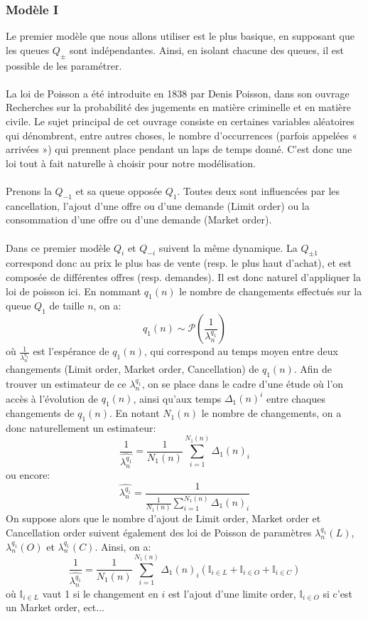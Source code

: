 \documentclass[12pt,a4paper]{article}
\theoremstyle{definition}
\theoremstyle{remark}
\begin{document}
    \subsubsection{Modèle I}

    Le premier modèle que nous allons utiliser est le plus basique, en supposant que les queues $Q_{\pm }$ sont indépendantes. Ainsi, en isolant chacune des queues, il est possible de les paramétrer.
    \\
    \\
    La loi de Poisson a été introduite en 1838 par Denis Poisson, dans son ouvrage Recherches sur la probabilité des jugements en matière criminelle et en matière civile. Le sujet principal de cet ouvrage consiste en certaines variables aléatoires qui dénombrent, entre autres choses, le nombre d'occurrences (parfois appelées « arrivées ») qui prennent place pendant un laps de temps donné. C'est donc une loi tout à fait naturelle à choisir pour notre modélisation.
    \\
    \\
    Prenons la $Q_{-1}$ et sa queue opposée $Q_1$. Toutes deux sont influencées par les cancellation, l'ajout d'une offre ou d'une demande (Limit order) ou la consommation d'une offre ou d'une demande (Market order). 
    \\
    \\
    Dans ce premier modèle $Q_i$ et $Q_{-i}$ suivent la même dynamique. La $Q_{\pm 1}$ correspond donc au prix le plus bas de vente (resp. le plus haut d'achat), et est composée de différentes offres (resp. demandes). Il est donc naturel d'appliquer la loi de poisson ici. En nommant $q_1(n)$ le nombre de changements effectués sur la queue $Q_1$ de taille $n$, on a:
    $$q_1(n)\sim\mathcal{P}(\frac{1}{\lambda^{q_1}_n})$$ où $\frac{1}{\lambda^{q_1}_n}$ est l'espérance de $q_1(n)$, qui correspond au temps moyen entre deux changements (Limit order, Market order, Cancellation)  de $q_1(n)$. Afin de trouver un estimateur de ce $\lambda^{q_1}_n$, on se place dans le cadre d'une étude où l'on accès à l'évolution de $q_1(n)$, ainsi qu'aux temps $\Delta_1(n)^{i}$ entre chaques changements de $q_1(n)$. En notant $N_1(n)$ le nombre de changements, on a donc naturellement un estimateur:
    $$\frac{1}{\hat{\lambda^{q_1}_n}} = \frac{1}{N_1(n)}\sum_{i=1}^{N_1(n)}\Delta_1(n)_i$$
    ou encore:
    $$\hat{\lambda^{q_1}_n} = \frac{1}{\frac{1}{N_1(n)}\sum_{i=1}^{N_1(n)}\Delta_1(n)_i}$$
    On suppose alors que le nombre d'ajout de Limit order, Market order et  Cancellation order suivent également des loi de Poisson de paramètres $\lambda^{q_1}_n(L)$, $\lambda^{q_1}_n(O)$ et  $\lambda^{q_1}_n(C)$. Ainsi, on a:
    $$\frac{1}{\hat{\lambda^{q_1}_n}} = \frac{1}{N_1(n)}\sum_{i=1}^{N_1(n)}\Delta_1(n)_i(\mathbb{I}_{i\in L}+\mathbb{I}_{i\in O}+\mathbb{I}_{i\in C})$$
    où $\mathbb{I}_{i\in L}$ vaut 1 si le changement en $i$ est l'ajout d'une limite order, $\mathbb{I}_{i\in O}$ si c'est un Market order, ect...
\end{document}
